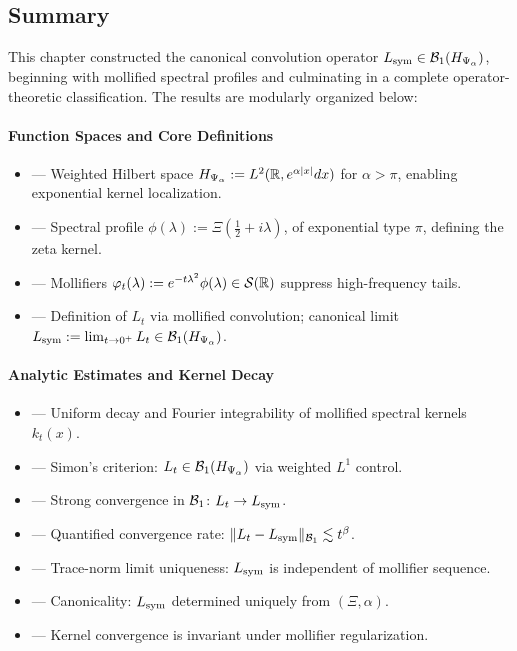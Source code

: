 \subsection*{Summary}

This chapter constructed the canonical convolution operator \( L_{\mathrm{sym}} \in \mathcal{B}_1(H_{\Psi_\alpha}) \), beginning with mollified spectral profiles and culminating in a complete operator-theoretic classification. The results are modularly organized below:

\paragraph{Function Spaces and Core Definitions}
\begin{itemize}
  \item {} — Weighted Hilbert space \( H_{\Psi_\alpha} := L^2(\mathbb{R}, e^{\alpha |x|} dx) \) for \( \alpha > \pi \), enabling exponential kernel localization.
  \item {} — Spectral profile \( \phi(\lambda) := \Xi(\tfrac{1}{2} + i\lambda) \), of exponential type \( \pi \), defining the zeta kernel.
  \item {} — Mollifiers \( \varphi_t(\lambda) := e^{-t\lambda^2} \phi(\lambda) \in \mathcal{S}(\mathbb{R}) \) suppress high-frequency tails.
  \item {} — Definition of \( L_t \) via mollified convolution; canonical limit \( L_{\mathrm{sym}} := \lim_{t \to 0^+} L_t \in \mathcal{B}_1(H_{\Psi_\alpha}) \).
\end{itemize}

\paragraph{Analytic Estimates and Kernel Decay}
\begin{itemize}
  \item {} — Uniform decay and Fourier integrability of mollified spectral kernels \( k_t(x) \).
  \item {} — Simon’s criterion: \( L_t \in \mathcal{B}_1(H_{\Psi_\alpha}) \) via weighted \( L^1 \) control.
  \item {} — Strong convergence in \( \mathcal{B}_1 \): \( L_t \to L_{\mathrm{sym}} \).
  \item {} — Quantified convergence rate: \( \|L_t - L_{\mathrm{sym}}\|_{\mathcal{B}_1} \lesssim t^\beta \).
  \item {} — Trace-norm limit uniqueness: \( L_{\mathrm{sym}} \) is independent of mollifier sequence.
  \item {} — Canonicality: \( L_{\mathrm{sym}} \) determined uniquely from \( (\Xi, \alpha) \).
  \item {} — Kernel convergence is invariant under mollifier regularization.
\end{itemize}

